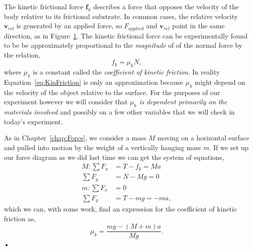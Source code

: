\documentclass[main.tex]{subfiles}
\begin{document}
\begin{figure}
\centering
{}
\caption{} \label{fig:KinFriction}
\end{figure}
The kinetic frictional force $\boldsymbol{f}_k$ describes a force that opposes the velocity of the body relative to its frictional substrate. In common cases, the relative velocity $\mathbf{v}_{rel}$ is generated by an applied force, so $F_{applied}$ and $\mathbf{v}_{rel}$ point in the same direction, as in Figure~\ref{fig:KinFriction}. The kinetic frictional force can be experimentally found to be be approximately proportional to the \emph{magnitude} of of the normal force by the relation,
\begin{equation} \label{eq:KinFriction}
f_k=\mu_kN,
\end{equation}
where $\mu_k$ is a constant called the \emph{coefficient of kinetic friction}. In reality Equation~\eqref{eq:KinFriction} is only an approximation because $\mu_k$ might depend on the velocity of the object relative to the surface.  For the purposes of our experiment however we will consider that $\mu_k$ \emph{is dependent primarily on the materials involved} and possibly on a few other variables that we will check in today's experiment.

As in Chapter~\ref{chap:Force}, we consider a mass $M$ moving on a horizontal surface and pulled into motion by the weight of a vertically hanging mass $m.$ If we set up our force diagram as we did last time we can get the system of equations,
\begin{subequations}
\begin{align}
M: 	\sum F_x &= T-f_k=Ma\\
	\sum F_y &=N-Mg=0\\
m:	\sum F_x &=0\\
	\sum	F_y &=T-mg=-ma,
\end{align}
\end{subequations}
which we can, with some work, find an expression for the coefficient of kinetic friction as,
\begin{equation} \label{eq:muk}
\mu_k=\frac{mg-(M+m)a}{Mg}.
\end{equation}•
\end{document}
